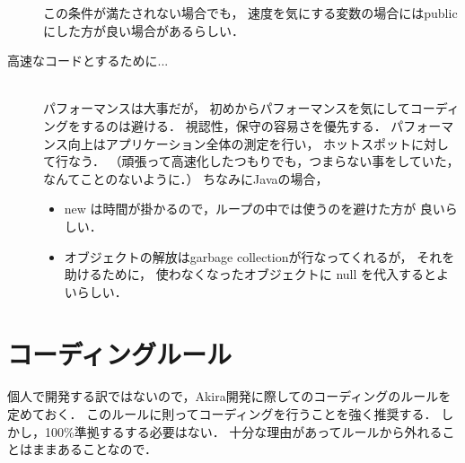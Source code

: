 \documentclass[a4j,openany]{jbook}
\begin{document}
\begin{description}
              この条件が満たされない場合でも，
              速度を気にする変数の場合にはpublicにした方が良い場合があるらしい．
   \item[高速なコードとするために...] \mbox{} \\
              パフォーマンスは大事だが，
              初めからパフォーマンスを気にしてコーディングをするのは避ける．
              視認性，保守の容易さを優先する．
              パフォーマンス向上はアプリケーション全体の測定を行い，
              ホットスポットに対して行なう．
              （頑張って高速化したつもりでも，つまらない事をしていた，
              なんてことのないように．）
              ちなみにJavaの場合，
              \begin{itemize}
               \item new は時間が掛かるので，ループの中では使うのを避けた方が
                     良いらしい．
               \item オブジェクトの解放はgarbage collectionが行なってくれるが，
                     それを助けるために， 使わなくなったオブジェクトに
                     null を代入するとよいらしい．
              \end{itemize}
  \end{description}

  \section{コーディングルール}
  個人で開発する訳ではないので，Akira開発に際してのコーディングのルールを定めておく．
  このルールに則ってコーディングを行うことを強く推奨する．
  しかし，100\%準拠するする必要はない．
  十分な理由があってルールから外れることはままあることなので．
\end{document}
